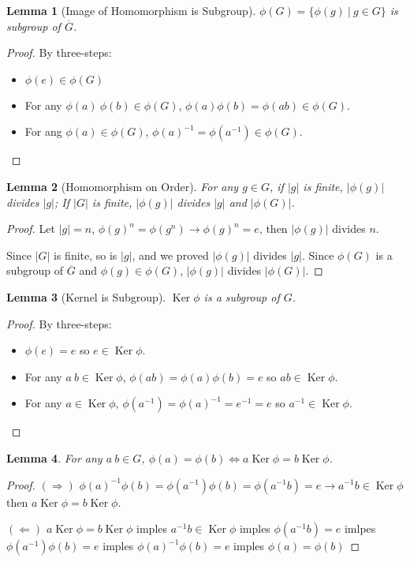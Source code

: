 \documentclass[14pt]{extarticle}
\newtheorem{lemma}{Lemma}[section]
\DeclareMathOperator{\Ker}{Ker}
\newcommand{\inv}[1]{#1^{-1}}
\newcommand{\1}{\{e\}}
\begin{document}
\begin{lemma}[Image of Homomorphism is Subgroup]
  $\phi(G) = \{ \phi(g) \ | \ g \in G \}$ is subgroup of $\overline{G}$.
\end{lemma}
\begin{proof}
  By three-steps:
  \begin{itemize}
    \item $\phi(e) \in \phi(G)$
    \item For any $\phi(a) \ \phi(b) \in \phi(G)$, $\phi(a)\phi(b) = \phi(ab) \in \phi(G)$.
    \item For ang $\phi(a) \in \phi(G)$, $\inv{\phi(a)} = \phi(\inv{a}) \in \phi(G)$.
  \end{itemize}
\end{proof}

\begin{lemma}[Homomorphism on Order]
  For any $g \in G$, if $|g|$ is finite, $|\phi(g)|$ divides $|g|$;
  If $|G|$ is finite, $|\phi(g)|$ divides $|g|$ and $|\phi(G)|$.
\end{lemma}
\begin{proof}
  Let $|g| = n$, $\phi(g)^n = \phi(g^n) \rightarrow \phi(g)^n = e$, then $|\phi(g)|$ divides $n$.

  Since $|G|$ is finite, so is $|g|$, and we proved $|\phi(g)|$ divides $|g|$.
  Since $\phi(G)$ is a subgroup of $\overline{G}$ and $\phi(g) \in \phi(G)$, $|\phi(g)|$ divides $|\phi(G)|$.
\end{proof}

\begin{lemma}[Kernel is Subgroup]
  $\Ker \phi$ is a subgroup of $G$.
\end{lemma}
\begin{proof}
  By three-steps:

  \begin{itemize}
    \item $\phi(e) = e$ so $e \in \Ker \phi$.
    \item For any $a \ b \in \Ker \phi$, $\phi(ab) = \phi(a)\phi(b) = e$ so $ab \in \Ker \phi$.
    \item For any $a \in \Ker \phi$, $\phi(\inv{a}) = \inv{\phi(a)} = \inv{e} = e$ so $\inv{a} \in \Ker \phi$.
  \end{itemize}
\end{proof}

\begin{lemma}
  \label{lemma:10.7}
  For any $a \ b \in G$, $\phi(a) = \phi(b) \iff a \Ker \phi = b \Ker \phi$.
\end{lemma}
\begin{proof}
  $(\Longrightarrow)$ $\inv{\phi(a)}\phi(b) = \phi(\inv{a})\phi(b) = \phi(\inv{a}b) = e \rightarrow \inv{a}b \in \Ker \phi$ 
  then $a \Ker \phi = b \Ker \phi$.

  $(\Longleftarrow)$ $a \Ker \phi = b \Ker \phi$ 
  imples $\inv{a}b \in \Ker \phi$ 
  imples $\phi(\inv{a}b) = e$
  imlpes $\phi(\inv{a}) \phi(b) = e$
  imples $\inv{\phi({a})} \phi(b) = e$
  imples $\phi(a) = \phi(b)$
\end{proof}
\end{document}
